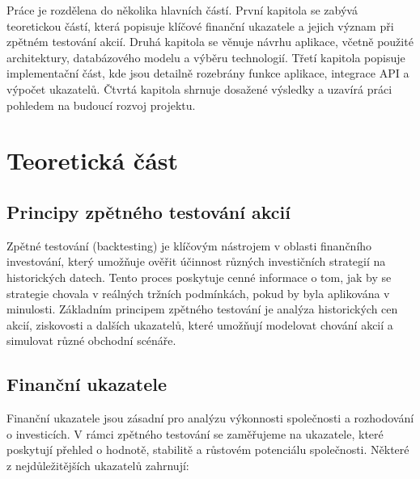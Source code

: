 \documentclass[12pt, a4paper]{report}
\begin{document}
Práce je rozdělena do několika hlavních částí. První kapitola se zabývá teoretickou částí, která popisuje klíčové finanční ukazatele a jejich význam při zpětném testování akcií. Druhá kapitola se věnuje návrhu aplikace, včetně použité architektury, databázového modelu a výběru technologií. Třetí kapitola popisuje implementační část, kde jsou detailně rozebrány funkce aplikace, integrace API a výpočet ukazatelů. Čtvrtá kapitola shrnuje dosažené výsledky a uzavírá práci pohledem na budoucí rozvoj projektu.

\chapter{Teoretická část}


\section{Principy zpětného testování akcií}


Zpětné testování (backtesting) je klíčovým nástrojem v oblasti finančního investování, který umožňuje ověřit účinnost různých investičních strategií na historických datech. Tento proces poskytuje cenné informace o tom, jak by se strategie chovala v reálných tržních podmínkách, pokud by byla aplikována v minulosti. Základním principem zpětného testování je analýza historických cen akcií, ziskovosti a dalších ukazatelů, které umožňují modelovat chování akcií a simulovat různé obchodní scénáře.

\section{Finanční ukazatele}

Finanční ukazatele jsou zásadní pro analýzu výkonnosti společnosti a rozhodování o investicích. V rámci zpětného testování se zaměřujeme na ukazatele, které poskytují přehled o hodnotě, stabilitě a růstovém potenciálu společnosti. Některé z nejdůležitějších ukazatelů zahrnují:
\end{document}
